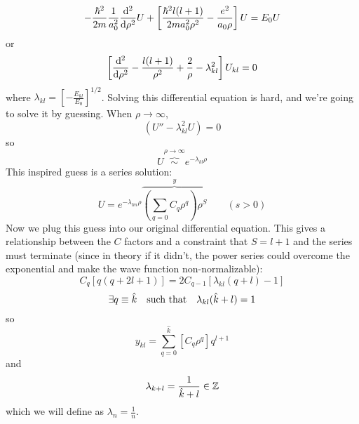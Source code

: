 \documentclass[a4paper,twoside,master.tex]{subfiles}
\begin{document}
\begin{equation}
    - \frac{\hbar^2}{2m} \frac{1}{a_0^2} \dv[2]{\rho} U + \left[ \frac{\hbar^2 l(l+1)}{2m a_0^2 \rho^2} - \frac{e^2}{a_0 \rho} \right] U = E_0 U
\end{equation}
or
\begin{equation}
    \left[ \dv[2]{\rho} - \frac{l(l+1)}{\rho^2} + \frac{2}{\rho} - \lambda_{kl}^2 \right] U_{kl} = 0
\end{equation}
where $ \lambda_{kl} = \left[ - \frac{E_{kl}}{E_0} \right]^{1/2} $. Solving this differential equation is hard, and we're going to solve it by guessing. When $ \rho \to \infty $,
\begin{equation}
    (U'' - \lambda_{kl}^2 U) = 0
\end{equation}
so
\begin{equation}
    U \overbrace{\sim}^{\rho \to \infty} e^{- \lambda_{kl} \rho}
\end{equation}
This inspired guess is a series solution:
\begin{equation}
    U = e^{- \lambda_{lm} \rho} \overbrace{\left( \sum_{q=0} C_q \rho^q \right) \rho^S}^{y} \qquad (s>0)
\end{equation}
Now we plug this guess into our original differential equation. This gives a relationship between the $ C $ factors and a constraint that $ S = l+1 $ and the series must terminate (since in theory if it didn't, the power series could overcome the exponential and make the wave function non-normalizable):
\begin{equation}
    C_q \left[ q (q + 2l + 1) \right] = 2 C_{q-1} \left[ \lambda_{kl} (q+l) - 1 \right]
\end{equation}
\begin{equation}
    \exists q \equiv \hat{k} \qq{such that} \lambda_{kl} (\hat{k} + l) = 1
\end{equation}
so
\begin{equation}
    y_{kl} = \sum_{q=0}^{\hat{k}} \left[ C_q \rho^q \right] q^{l+1} 
\end{equation}
and
\begin{equation}
    \lambda_{k+l} = \frac{1}{\hat{k} + l} \in \mathbb{Z}
\end{equation}
which we will define as $ \lambda_{n} = \frac{1}{n} $.
\end{document}
